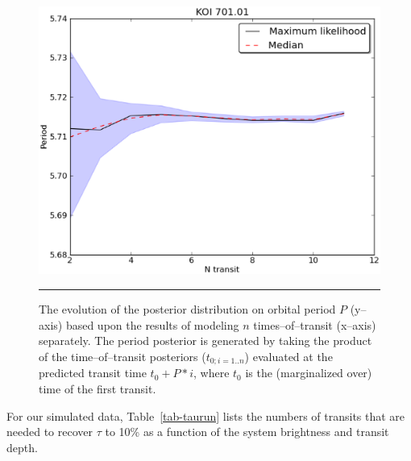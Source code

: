\begin{figure}[t] 
  \begin{minipage}[c]{0.47\textwidth}
    \includegraphics[width=\textwidth]{figures/period.eps}
  \end{minipage}\hfill
  \begin{minipage}[c]{0.5\textwidth}
    \caption{The evolution of the posterior distribution on orbital
      period $P$ (y--axis) based upon the results of modeling $n$
      times--of--transit (x--axis) separately.  The period posterior
      is generated by taking the product of the time--of--transit
      posteriors ($t_{0;i=1..n}$) evaluated at the predicted transit
      time $t_0 + P * i$, where $t_0$ is the (marginalized over) time
      of the first transit.  }
    \label{fig-period}
    \hspace*{\fill}  
    \hrule
  \end{minipage}
\end{figure}


For our simulated data, Table~\ref{tab-taurun} lists the numbers of
transits that are needed to recover $\tau$ to 10\% as a function of
the system brightness and transit depth.

